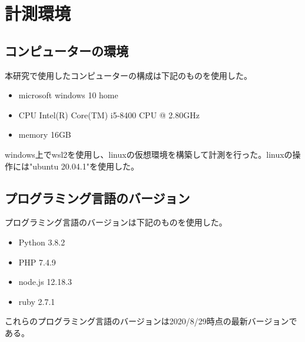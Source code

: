 \chapter{計測環境}
\label{cha:environment}
\section{コンピューターの環境}
本研究で使用したコンピューターの構成は下記のものを使用した。
\begin{itemize}
  \item microsoft windows 10 home
  \item CPU Intel(R) Core(TM) i5-8400 CPU @ 2.80GHz
  \item memory 16GB
\end{itemize}

windows上でwsl2を使用し、linuxの仮想環境を構築して計測を行った。linuxの操作には"ubuntu 20.04.1"を使用した。

\section{プログラミング言語のバージョン}
プログラミング言語のバージョンは下記のものを使用した。
\begin{itemize}
  \item Python 3.8.2
  \item PHP 7.4.9
　\item node.js 12.18.3
  \item ruby 2.7.1
\end{itemize}
これらのプログラミング言語のバージョンは2020/8/29時点の最新バージョンである。